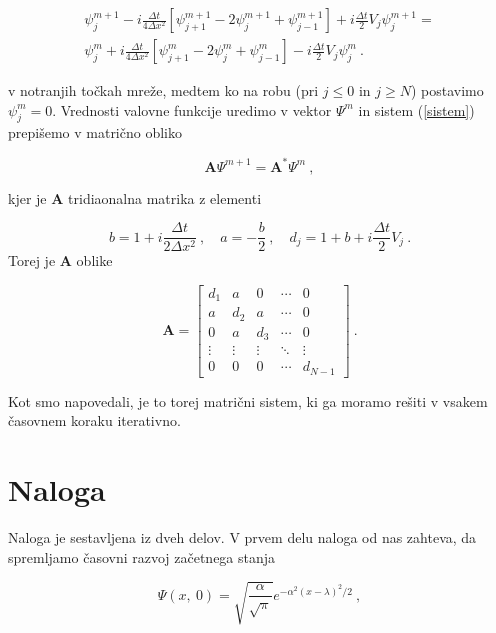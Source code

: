 \documentclass[a4paper]{article}
\begin{document}
\begin{multline}
    \psi_j^{m+1} - i \frac{\Delta t}{4\Delta x^2}\left[\psi_{j+1}^{m+1} - 2\psi_j^{m+1} + \psi_{j-1}^{m+1}\right] + i \frac{\Delta t}{2} V_j \psi_j^{m+1} = \\
    \psi_j^m + i \frac{\Delta t}{4\Delta x^2}\left[\psi_{j+1}^m - 2\psi_j^m + \psi_{j-1}^m\right] - i \frac{\Delta t}{2}V_j\psi_j^m\>.
    \label{sistem}
\end{multline}

v notranjih točkah mreže, medtem ko na robu (pri $j\le 0$ in $j\ge N$) postavimo $\psi_j^{m} = 0$. Vrednosti valovne funkcije uredimo v 
vektor $\Psi^m$ in sistem (\ref{sistem}) prepišemo v matrično obliko

\begin{equation}
    \mathbf{A}\Psi^{m+1} = \mathbf{A^*}\Psi^m\>,
\end{equation}

kjer je $\mathbf{A}$ tridiaonalna matrika z elementi

\begin{equation}
    b = 1 + i\frac{\Delta t}{2\Delta x^2}\>,\quad a = -\frac{b}{2}\>,\quad d_j = 1 + b + i\frac{\Delta t}{2}V_j\>.
\end{equation}
Torej je $\mathbf{A}$ oblike

\begin{equation}
    \mathbf{A} = \begin{bmatrix}
        d_1 & a & 0 & \cdots & 0 \\
        a & d_2 & a & \cdots & 0 \\
        0 & a & d_3 & \cdots & 0 \\
        \vdots & \vdots & \vdots & \ddots & \vdots \\
        0 & 0 & 0 & \cdots & d_{N-1}
    \end{bmatrix}\>.
\end{equation}

Kot smo napovedali, je to torej matrični sistem, ki ga moramo rešiti v vsakem časovnem koraku iterativno.

\section{Naloga}
Naloga je sestavljena iz dveh delov. V prvem delu naloga od nas zahteva, da spremljamo časovni razvoj 
začetnega stanja

\begin{equation}
    \Psi(x,\>0) = \sqrt{\frac{\alpha}{\sqrt{\pi}}} e^{-\alpha^2(x-\lambda)^2/2}\>,
    \label{zacetno_stanje1}
\end{equation}
\end{document}
